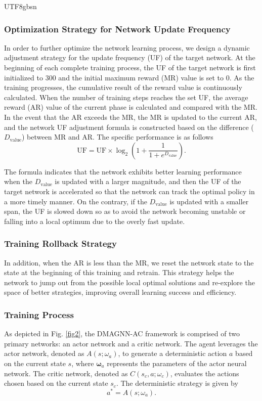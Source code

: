 \documentclass[lettersize,journal]{IEEEtran}
\begin{document}
\begin{CJK}{UTF8}{gbsn}
\subsubsection{Optimization Strategy for Network Update Frequency}
In order to further optimize the network learning process, we design a dynamic adjustment strategy for the update frequency (UF) of the target network. At the beginning of each complete training process, the UF of the target network is first initialized to $300$ and the initial maximum reward (MR) value is set to $0$. As the training progresses, the cumulative result of the reward value is continuously calculated. When the number of training steps reaches the set UF, the average reward (AR) value of the current phase is calculated and compared with the MR. In the event that the AR exceeds the MR, the MR is updated to the current AR, and the network UF adjustment formula is constructed based on the difference ($D_\text{value}$) between MR and AR. The specific performance is as follows
\begin{equation}\text{UF}=\text{UF}\times \log_{2}{\left ( 1+\frac{1}{1+e^{D_\text{value}} }  \right ) }. \end{equation}

The formula indicates that the network exhibits better learning performance when the $D_{\text{value}}$ is updated with a larger magnitude, and then the UF of the target network is accelerated so that the network can track the optimal policy in a more timely manner. On the contrary, if the $D_{\text{value}}$ is updated with a smaller span, the UF is slowed down so as to avoid the network becoming unstable or falling into a local optimum due to the overly fast update.

\subsubsection{Training Rollback Strategy} 
In addition, when the AR is less than the MR, we reset the network state to the state at the beginning of this training and retrain. This strategy helps the network to jump out from the possible local optimal solutions and re-explore the space of better strategies, improving overall learning success and efficiency.

\subsubsection{Training Process}
As depicted in Fig. \ref{fig2}, the DMAGNN-AC framework is comprised of two primary networks: an actor network and a critic network. The agent leverages the actor network, denoted as $A(s;\omega _a)$, to generate a deterministic action $a$ based on the current state $s$, where $\mathbf{\omega }_a$ represents the parameters of the actor neural network. The critic network, denoted as $C(s_c,a;\omega  _c)$, evaluates the actions chosen based on the current state $s_c$. The deterministic strategy is given by
\begin{equation}a ^* = A(s;\omega  _a).\end{equation}


\end{CJK}
\end{document}
